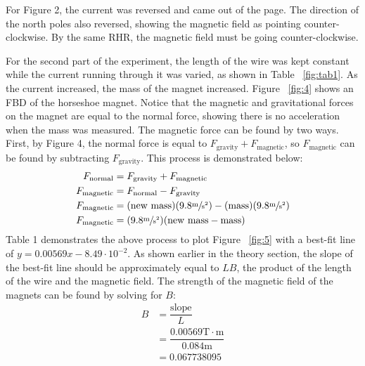 \documentclass [12pt, letterpaper, twoside] {article}
\begin{document}
\noindent
For Figure 2, the current was reversed and came out of the page. The direction of the north poles also reversed, showing the magnetic field as pointing counter-clockwise. By the same RHR, the magnetic field must be going counter-clockwise.

\noindent
For the second part of the experiment, the length of the wire was kept constant while the current running through it was varied, as shown in Table ~\ref{fig:tab1}. As the current increased, the mass of the magnet increased. Figure ~\ref{fig:4} shows an FBD of the horseshoe magnet. Notice that the magnetic and gravitational forces on the magnet are equal to the normal force, showing there is no acceleration when the mass was measured. The magnetic force can be found by two ways. First, by Figure 4, the normal force is equal to \(F_{\text{gravity}} + F_{\text{magnetic}}\), so \(F_{\text{magnetic}}\) can be found by subtracting \(F_{\text{gravity}}\). This process is demonstrated below:
\begin{equation*}
  \begin{split}
    F_{\text{normal}} &= F_{\text{gravity}} + F_{\text{magnetic}} \\
    F_{\text{magnetic}} &= F_{\text{normal}} - F_{\text{gravity}} \\
    F_{\text{magnetic}} &= (\text{new mass})(9.8 \sfrac{\text{m}}{\text{s}^{2}}) - (\text{mass})(9.8 \sfrac{\text{m}}{\text{s}^{2}}) \\
    F_{\text{magnetic}} &= (9.8\sfrac{\text{m}}{\text{s}^{2}})(\text{new mass} - \text{mass}) \\
  \end{split}
\end{equation*}
Table 1 demonstrates the above process to plot Figure ~\ref{fig:5} with a best-fit line of \(y = 0.00569x - 8.49\cdot{10}^{-2}\). As shown earlier in the theory section, the slope of the best-fit line should be approximately equal to \(LB\), the product of the length of the wire and the magnetic field. The strength of the magnetic field of the magnets can be found by solving for \(B\):
\begin{equation*}
  \begin{split}
    B &= \dfrac{\text{slope}}{L} \\
      &= \dfrac{0.00569\text{T}\cdot\text{m}}{0.084\text{m}} \\
      &= 0.067738095 \\
  \end{split}
\end{equation*}
\end{document}
